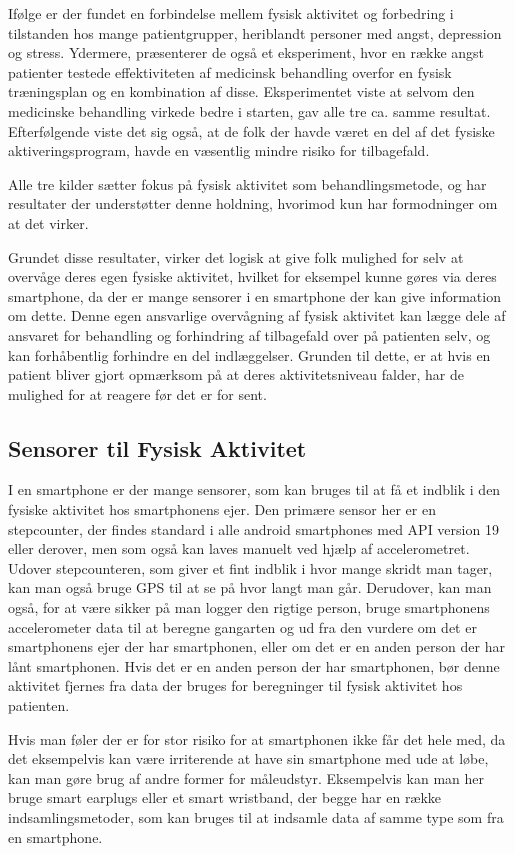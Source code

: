 Ifølge \citet{book:sportPsyc} er der fundet en forbindelse mellem fysisk aktivitet og forbedring i tilstanden hos mange patientgrupper, heriblandt personer med angst, depression og stress.
Ydermere, præsenterer de også et eksperiment, hvor en række angst patienter testede effektiviteten af medicinsk behandling overfor en fysisk træningsplan og en kombination af disse.
Eksperimentet viste at selvom den medicinske behandling virkede bedre i starten, gav alle tre ca. samme resultat.
Efterfølgende viste det sig også, at de folk der havde været en del af det fysiske aktiveringsprogram, havde en væsentlig mindre risiko for tilbagefald.

Alle tre kilder sætter fokus på fysisk aktivitet som behandlingsmetode, \citet{art:physMental} og \citet{book:sportPsyc} har resultater der understøtter denne holdning, hvorimod \citet{misc:healthReports} kun har formodninger om at det virker.

Grundet disse resultater, virker det logisk at give folk mulighed for selv at overvåge deres egen fysiske aktivitet, hvilket for eksempel kunne gøres via deres smartphone, da der er mange sensorer i en smartphone der kan give information om dette.
Denne egen ansvarlige overvågning af fysisk aktivitet kan lægge dele af ansvaret for behandling og forhindring af tilbagefald over på patienten selv, og kan forhåbentlig forhindre en del indlæggelser.
Grunden til dette, er at hvis en patient bliver gjort opmærksom på at deres aktivitetsniveau falder, har de mulighed for at reagere før det er for sent.

\subsection{Sensorer til Fysisk Aktivitet}
I en smartphone er der mange sensorer, som kan bruges til at få et indblik i den fysiske aktivitet hos smartphonens ejer.
Den primære sensor her er en stepcounter, der findes standard i alle android smartphones med API version 19 eller derover, men som også kan laves manuelt ved hjælp af accelerometret.
Udover stepcounteren, som giver et fint indblik i hvor mange skridt man tager, kan man også bruge GPS til at se på hvor langt man går.
Derudover, kan man også, for at være sikker på man logger den rigtige person, bruge smartphonens accelerometer data til at beregne gangarten \citep{4272626} og ud fra den vurdere om det er smartphonens ejer der har smartphonen, eller om det er en anden person der har lånt smartphonen.
Hvis det er en anden person der har smartphonen, bør denne aktivitet fjernes fra data der bruges for beregninger til fysisk aktivitet hos patienten.

Hvis man føler der er for stor risiko for at smartphonen ikke får det hele med, da det eksempelvis kan være irriterende at have sin smartphone med ude at løbe, kan man gøre brug af andre former for måleudstyr.
Eksempelvis kan man her bruge smart earplugs eller et smart wristband, der begge har en række indsamlingsmetoder, som kan bruges til at indsamle data af samme type som fra en smartphone.